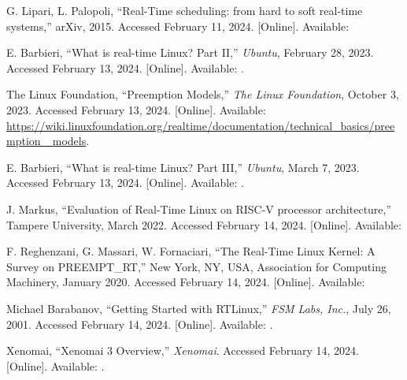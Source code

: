\begin{thebibliography}{99}
        G. Lipari, L. Palopoli,
        ``Real-Time scheduling: from hard to soft real-time systems,''
        arXiv, 2015.
        Accessed February 11, 2024.
        [Online].
        Available: 

        E. Barbieri,
        ``What is real-time Linux? Part II,''
        \textit{Ubuntu}, February 28, 2023.
        Accessed February 13, 2024.
        [Online].
        Available: .

        The Linux Foundation,
        ``Preemption Models,''
        \textit{The Linux Foundation}, October 3, 2023.
        Accessed February 13, 2024.
        [Online].
        Available: \href{https://wiki.linuxfoundation.org/realtime/documentation/technical\_basics/preemption\_models}{https://wiki.linuxfoundation.org/realtime/documentation/technical\_basics/preemption \_models}.

        E. Barbieri,
        ``What is real-time Linux? Part III,''
        \textit{Ubuntu}, March 7, 2023.
        Accessed February 13, 2024.
        [Online].
        Available: .

        J. Markus,
        ``Evaluation of Real-Time Linux on RISC-V processor architecture,''
        Tampere University, March 2022.
        Accessed February 14, 2024.
        [Online].
        Available: 

        F. Reghenzani, G. Massari, W. Fornaciari,
        ``The Real-Time Linux Kernel: A Survey on PREEMPT\_RT,''
        New York, NY, USA, Association for Computing Machinery, January 2020.
        Accessed February 14, 2024.
        [Online].
        Available: 

        Michael Barabanov,
        ``Getting Started with RTLinux,''
        \textit{FSM Labs, Inc.}, July 26, 2001.
        Accessed February 14, 2024.
        [Online].
        Available: .

        Xenomai,
        ``Xenomai 3 Overview,''
        \textit{Xenomai}.
        Accessed February 14, 2024.
        [Online].
        Available: .


\end{thebibliography}

